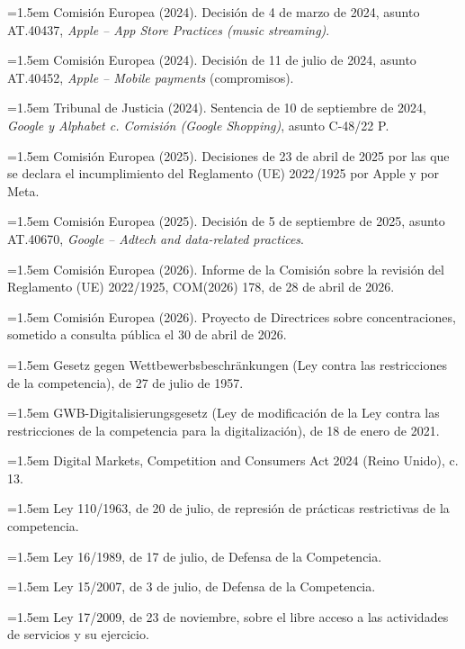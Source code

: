 \documentclass[10pt,a4paper]{article}
\begin{document}
\noindent\hangindent=1.5em Comisión Europea (2024). Decisión de 4 de marzo de 2024, asunto AT.40437, \textit{Apple -- App Store Practices (music streaming)}.

\noindent\hangindent=1.5em Comisión Europea (2024). Decisión de 11 de julio de 2024, asunto AT.40452, \textit{Apple -- Mobile payments} (compromisos).

\noindent\hangindent=1.5em Tribunal de Justicia (2024). Sentencia de 10 de septiembre de 2024, \textit{Google y Alphabet c. Comisión (Google Shopping)}, asunto C-48/22 P.

\noindent\hangindent=1.5em Comisión Europea (2025). Decisiones de 23 de abril de 2025 por las que se declara el incumplimiento del Reglamento (UE) 2022/1925 por Apple y por Meta.

\noindent\hangindent=1.5em Comisión Europea (2025). Decisión de 5 de septiembre de 2025, asunto AT.40670, \textit{Google -- Adtech and data-related practices}.

\noindent\hangindent=1.5em Comisión Europea (2026). Informe de la Comisión sobre la revisión del Reglamento (UE) 2022/1925, COM(2026) 178, de 28 de abril de 2026.

\noindent\hangindent=1.5em Comisión Europea (2026). Proyecto de Directrices sobre concentraciones, sometido a consulta pública el 30 de abril de 2026.

\noindent\hangindent=1.5em Gesetz gegen Wettbewerbsbeschränkungen (Ley contra las restricciones de la competencia), de 27 de julio de 1957.

\noindent\hangindent=1.5em GWB-Digitalisierungsgesetz (Ley de modificación de la Ley contra las restricciones de la competencia para la digitalización), de 18 de enero de 2021.

\noindent\hangindent=1.5em Digital Markets, Competition and Consumers Act 2024 (Reino Unido), c. 13.

\noindent\hangindent=1.5em Ley 110/1963, de 20 de julio, de represión de prácticas restrictivas de la competencia.

\noindent\hangindent=1.5em Ley 16/1989, de 17 de julio, de Defensa de la Competencia.

\noindent\hangindent=1.5em Ley 15/2007, de 3 de julio, de Defensa de la Competencia.

\noindent\hangindent=1.5em Ley 17/2009, de 23 de noviembre, sobre el libre acceso a las actividades de servicios y su ejercicio.
\end{document}
